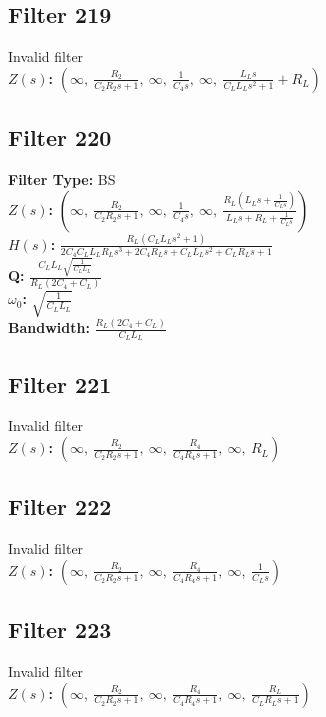 \documentclass{article}
\begin{document}
\subsection*{Filter 219}
Invalid filter \\ 
\textbf{$Z(s)$:} $\left( \infty, \  \frac{R_{2}}{C_{2} R_{2} s + 1}, \  \infty, \  \frac{1}{C_{4} s}, \  \infty, \  \frac{L_{L} s}{C_{L} L_{L} s^{2} + 1} + R_{L}\right)$ \\ 
\subsection*{Filter 220}
\textbf{Filter Type:} BS \\ 
\textbf{$Z(s)$:} $\left( \infty, \  \frac{R_{2}}{C_{2} R_{2} s + 1}, \  \infty, \  \frac{1}{C_{4} s}, \  \infty, \  \frac{R_{L} \left(L_{L} s + \frac{1}{C_{L} s}\right)}{L_{L} s + R_{L} + \frac{1}{C_{L} s}}\right)$ \\ 
\textbf{$H(s)$:} $\frac{R_{L} \left(C_{L} L_{L} s^{2} + 1\right)}{2 C_{4} C_{L} L_{L} R_{L} s^{3} + 2 C_{4} R_{L} s + C_{L} L_{L} s^{2} + C_{L} R_{L} s + 1}$ \\ 
\textbf{Q:} $\frac{C_{L} L_{L} \sqrt{\frac{1}{C_{L} L_{L}}}}{R_{L} \left(2 C_{4} + C_{L}\right)}$ \\ 
\textbf{$\omega_0$:} $\sqrt{\frac{1}{C_{L} L_{L}}}$ \\ 
\textbf{Bandwidth:} $\frac{R_{L} \left(2 C_{4} + C_{L}\right)}{C_{L} L_{L}}$ \\ 
\subsection*{Filter 221}
Invalid filter \\ 
\textbf{$Z(s)$:} $\left( \infty, \  \frac{R_{2}}{C_{2} R_{2} s + 1}, \  \infty, \  \frac{R_{4}}{C_{4} R_{4} s + 1}, \  \infty, \  R_{L}\right)$ \\ 
\subsection*{Filter 222}
Invalid filter \\ 
\textbf{$Z(s)$:} $\left( \infty, \  \frac{R_{2}}{C_{2} R_{2} s + 1}, \  \infty, \  \frac{R_{4}}{C_{4} R_{4} s + 1}, \  \infty, \  \frac{1}{C_{L} s}\right)$ \\ 
\subsection*{Filter 223}
Invalid filter \\ 
\textbf{$Z(s)$:} $\left( \infty, \  \frac{R_{2}}{C_{2} R_{2} s + 1}, \  \infty, \  \frac{R_{4}}{C_{4} R_{4} s + 1}, \  \infty, \  \frac{R_{L}}{C_{L} R_{L} s + 1}\right)$ \\ 
\end{document}
